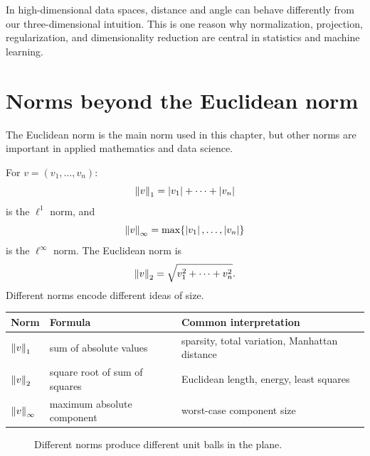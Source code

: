 \begin{notebox}[title={Modern interpretation}]
In high-dimensional data spaces, distance and angle can behave differently from our three-dimensional intuition. This is one reason why normalization, projection, regularization, and dimensionality reduction are central in statistics and machine learning.
\end{notebox}

\section{Norms beyond the Euclidean norm}

The Euclidean norm is the main norm used in this chapter, but other norms are important in applied mathematics and data science.

For $v=(v_1,\ldots,v_n)$:
\[
  \left\lVert v\right\rVert_1=\left\lvert v_1\right\rvert+\cdots+\left\lvert v_n\right\rvert
\]
is the $\ell^1$ norm, and
\[
  \left\lVert v\right\rVert_\infty=\max\{\left\lvert v_1\right\rvert,\ldots,\left\lvert v_n\right\rvert\}
\]
is the $\ell^\infty$ norm. The Euclidean norm is
\[
  \left\lVert v\right\rVert_2=\sqrt{v_1^2+\cdots+v_n^2}.
\]
Different norms encode different ideas of size.

\begin{center}
\begin{tabularx}{0.95\textwidth}{@{}l l X@{}}
\toprule
\textbf{Norm} & \textbf{Formula} & \textbf{Common interpretation} \\
\midrule
$\left\lVert v\right\rVert_1$ & sum of absolute values & sparsity, total variation, Manhattan distance \\
$\left\lVert v\right\rVert_2$ & square root of sum of squares & Euclidean length, energy, least squares \\
$\left\lVert v\right\rVert_\infty$ & maximum absolute component & worst-case component size \\
\bottomrule
\end{tabularx}
\end{center}

\begin{figure}[H]
\centering
{}
\caption{Different norms produce different unit balls in the plane.}
\end{figure}


